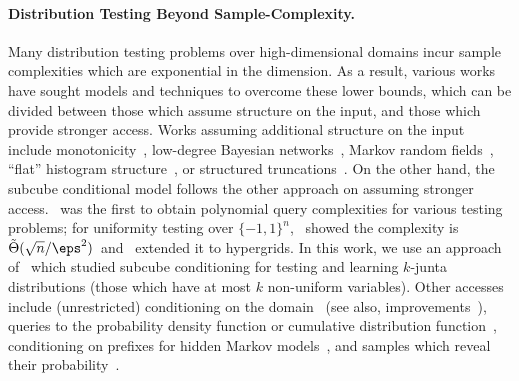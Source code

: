 \paragraph{Distribution Testing Beyond Sample-Complexity.} Many distribution testing problems over high-dimensional domains incur sample complexities which are exponential in the dimension. As a result, various works have sought models and techniques to overcome these lower bounds, which can be divided between those which assume structure on the input, and those which provide stronger access. Works assuming additional structure on the input include monotonicity~\cite{RS09}, low-degree Bayesian networks~\cite{CDKS17, DP17, ABDK18, DKP23}, Markov random fields~\cite{GLP18, DDK19, BBCSV20}, ``flat'' histogram structure~\cite{DKP19}, or structured truncations~\cite{DNS23, DLNS24}. On the other hand, the subcube conditional model follows the other approach on assuming stronger access.~\cite{BC18} was the first to obtain polynomial query complexities for various testing problems; for uniformity testing over $\{-1,1\}^n$,~\cite{CCKLW21} showed the complexity is $\tilde{\Theta}(\sqrt{n}/\eps^2)$~and~\cite{CM24} extended it to hypergrids. In this work, we use an approach of~\cite{CJLW21b} which studied subcube conditioning for testing and learning $k$-junta distributions (those which have at most $k$ non-uniform variables). Other accesses include (unrestricted) conditioning on the domain~\cite{CRS15,CFGM16} (see also, improvements~\cite{FJOPS15, ACK15, KT18, N21, CCK24, CCKM24}),  queries to the probability density function or cumulative distribution function~\cite{BDKR05, CR14}, conditioning on prefixes for hidden Markov models~\cite{MKKZ23}, and samples which reveal their probability~\cite{OS18}.